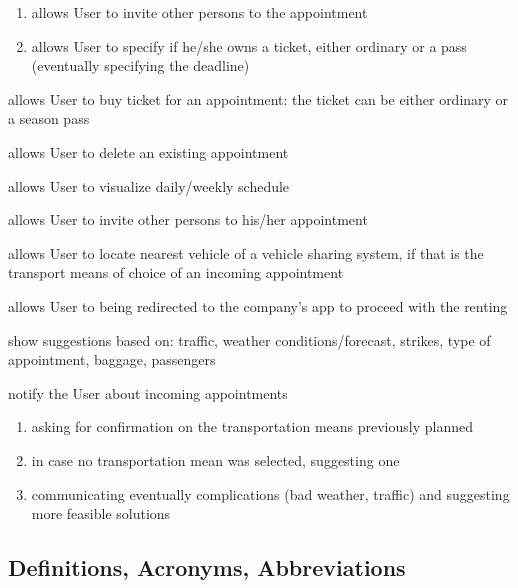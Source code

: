 \begin{enumerate}[label={[G\arabic*]}]
\begin{enumerate}[label=\theenumi\#{\arabic*}]
			\item allows User to invite other persons to the appointment
			\item allows User to specify if he/she owns a ticket, either ordinary or a pass (eventually specifying the deadline)
		\end{enumerate}
		\item allows User to buy ticket for an appointment: the ticket can be either ordinary or a season pass
		\item allows User to delete an existing appointment
		\item allows User to visualize daily/weekly schedule
		\item allows User to invite other persons to his/her appointment
		\item allows User to locate nearest vehicle of a vehicle sharing system, if that is the transport means of choice of an incoming appointment
			\item allows User to being redirected to the company's app to proceed with the renting

		\item show suggestions based on: traffic, weather conditions/forecast, strikes, type of appointment, baggage, passengers
		\item notify the User about incoming appointments
		\begin{enumerate}[label=\theenumi\#{\arabic*}]
			\item asking for confirmation on the transportation means previously planned
			\item in case no transportation mean was selected, suggesting one
			\item communicating eventually complications (bad weather, traffic) and suggesting more feasible solutions
		\end{enumerate}
	\end{enumerate}

\subsection{Definitions, Acronyms, Abbreviations}
